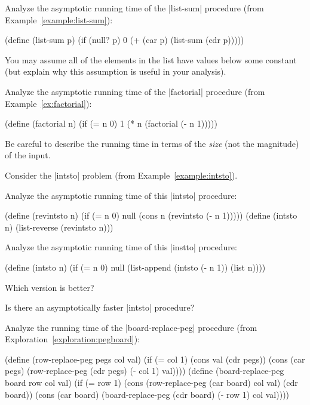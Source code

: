 \begin{schemeregion}
\beforeex
\begin{exercise}
Analyze the asymptotic running time of the \scheme|list-sum| procedure (from Example~\ref{example:list-sum}):
\begin{schemedisplay}
(define (list-sum p)
   (if (null? p) 
       0 
       (+ (car p) (list-sum (cdr p)))))
\end{schemedisplay}
You may assume all of the elements in the list have values below some constant (but explain why this assumption is useful in your analysis).
\solution{\LATER{}}
\end{exercise}
\afterex

\beforeex
\begin{exercise}
Analyze the asymptotic running time of the \scheme|factorial| procedure (from Example~\ref{ex:factorial}):
\begin{schemedisplay}
(define (factorial n) (if (= n 0) 1 (* n (factorial (- n 1)))))
\end{schemedisplay}
Be careful to describe the running time in terms of the \emph{size} (not the magnitude) of the input.
\solution{\LATER{}}
\end{exercise}
\afterex

\beforeex
\begin{exercise}
Consider the \scheme|intsto| problem (from Example~\ref{example:intsto}).
\begin{subexerciselist}
\item \goldstar Analyze the asymptotic running time of this \scheme|intsto| procedure:
\begin{schemedisplay}
(define (revintsto n)
  (if (= n 0) 
      null 
      (cons n (revintsto (- n 1)))))
(define (intsto n) (list-reverse (revintsto n)))
\end{schemedisplay}
\item \goldstar Analyze the asymptotic running time of this \scheme|instto| procedure:
\begin{schemedisplay}
(define (intsto n) 
   (if (= n 0) null (list-append (intsto (- n 1)) (list n))))
\end{schemedisplay}
\item Which version is better?
\item \doublegoldstar Is there an asymptotically faster \scheme|intsto| procedure?
\end{subexerciselist}
\solution{\LATER{}}
\end{exercise}
\afterex

\beforeex
\begin{exercise}
Analyze the running time of the \scheme|board-replace-peg| procedure (from Exploration~\ref{exploration:pegboard}):
\begin{schemedisplay}
(define (row-replace-peg pegs col val)
  (if (= col 1) (cons val (cdr pegs))
      (cons (car pegs) (row-replace-peg (cdr pegs) (- col 1) val))))
(define (board-replace-peg board row col val)
  (if (= row 1) (cons (row-replace-peg (car board) col val) (cdr board))
      (cons (car board) (board-replace-peg (cdr board) (- row 1) col val))))
\end{schemedisplay}
\solution{\LATER{}}
\end{exercise}
\afterex


\end{schemeregion}
